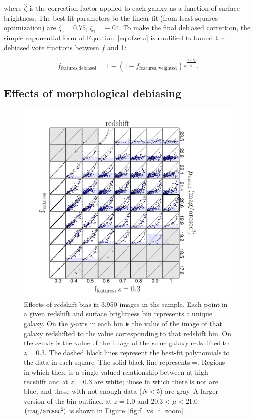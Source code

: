 \documentclass[twocolumn]{aastex6}
\begin{document}
\noindent where $\hat\zeta$ is the correction factor applied to each galaxy as
a function of surface brightness. The best-fit parameters to the linear fit
(from least-squares optimization) are $\zeta_0=0.75$, $\zeta_1=-.04$. To make the
final debiased correction, the simple exponential form of
Equation~\ref{eqn:fzeta} is modified to bound the debiased vote fractions
between $f$ and 1:

\begin{equation}
f_\textrm{features,debiased} = 1 - (1 - f_\mathrm{features,weighted})e^{\frac{z-z_0}{\hat\zeta}}.
\label{eqn:fzeta_mod}
\end{equation}

\subsection{Effects of morphological debiasing}\label{ssec:zeta_results}

\begin{figure}
\centering
\includegraphics[width=\textwidth]{figures/p_vs_p_SB_redshift.pdf}
\caption{Effects of redshift bias in 3,950 images in the \ferengi{} sample.
Each point in a given redshift and surface brightness bin represents a
unique galaxy. On the $y$-axis in each bin is the \ffeatures{} value of the
image of that galaxy redshifted to the value corresponding to that redshift
bin. On the $x$-axis is the \ffeatures{} value of the image of the same galaxy
redshifted to $z=0.3$. The dashed black lines represent the best-fit
polynomials to the data in each square. The solid black line represents
\ffeaturesz=\ffeaturesrest. Regions in which there is a single-valued
relationship between \ffeatures{} at high redshift and at $z=0.3$ are white;
those in which there is not are blue, and those with not enough data ($N<5$)
are gray. A larger version of the bin outlined at $z=1.0$ and $20.3 < \mu < 21.0$ $\rm (mag/arcsec^2)$ is shown in Figure~\ref{fig:f_vs_f_zoom}.}
\label{fig:f_vs_f}
\end{figure} 
\end{document}

